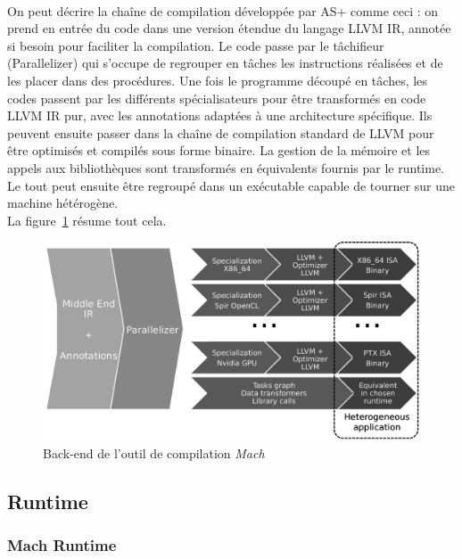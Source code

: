 \paragraph{}
On peut décrire la chaîne de compilation développée par AS+ comme ceci : on
prend en entrée du code dans une version étendue du langage LLVM IR, annotée si
besoin pour faciliter la compilation. Le code passe par le tâchifieur
(Parallelizer) qui s'occupe de regrouper en tâches les instructions réalisées et
de les placer dans des procédures. Une fois le programme découpé en tâches, les
codes passent par les différents spécialisateurs pour être transformés en code
LLVM IR pur, avec les annotations adaptées à une architecture spécifique. Ils
peuvent ensuite passer dans la chaîne de compilation standard de LLVM pour être
optimisés et compilés sous forme binaire. La gestion de la mémoire et les appels
aux bibliothèques sont transformés en équivalents fournis par le runtime. Le
tout peut ensuite être regroupé dans un exécutable capable de tourner sur une
machine hétérogène.\\
La figure~\ref{backend_mach} résume tout cela.

\begin{figure}[h!]
   \begin{center}
      \includegraphics[width=135mm]{./images/backend_mach.png}
   \end{center}
   \caption{Back-end de l'outil de compilation \emph{Mach}~\cite{toolchain_fr}}
   \label{backend_mach}
\end{figure}

\subsection{Runtime}
\subsubsection{Mach Runtime}
